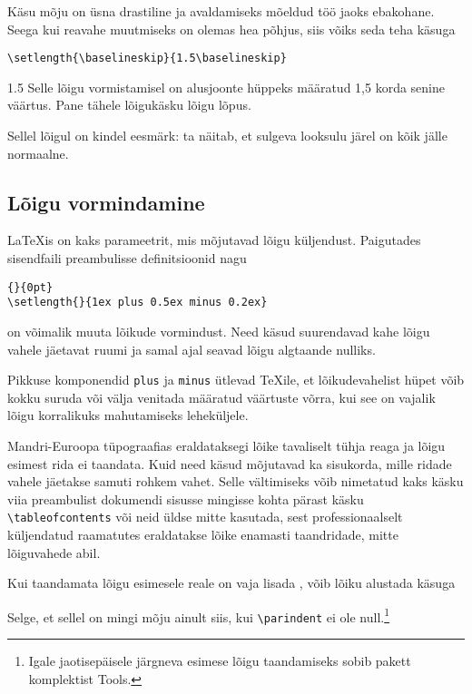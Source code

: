 Käsu  mõju on üsna drastiline ja avaldamiseks mõeldud töö
jaoks ebakohane. Seega kui reavahe muutmiseks on olemas hea põhjus, siis
võiks seda teha käsuga
\begin{lscommand}
\verb|\setlength{\baselineskip}{1.5\baselineskip}|
\end{lscommand}

\begin{example}
{\setlength{\baselineskip}%
           {1.5\baselineskip}
Selle lõigu vormistamisel on
alusjoonte hüppeks määratud 1{,}5
korda senine väärtus. Pane tähele
lõigukäsku lõigu lõpus.\par}

Sellel lõigul on kindel eesmärk:
ta näitab, et sulgeva looksulu
järel on kõik jälle normaalne.
\end{example}

\subsection{Lõigu vormindamine}\label{parsp}

\LaTeX is on kaks parameetrit, mis mõjutavad lõigu küljendust.
Paigutades sisendfaili preambulisse definitsioonid nagu
\begin{code}
\verb|{|\verb|}{0pt}| \\
\verb|\setlength{|\verb|}{1ex plus 0.5ex minus 0.2ex}|
\end{code}
on võimalik muuta lõikude vormindust. Need käsud suurendavad kahe lõigu
vahele jäetavat ruumi ja samal ajal seavad lõigu algtaande
nulliks.

Pikkuse komponendid \texttt{plus} ja \texttt{minus} ütlevad \TeX ile, et
lõikudevahelist hüpet võib kokku suruda või välja venitada määratud
väärtuste võrra, kui see on vajalik lõigu korralikuks mahutamiseks
leheküljele.

Mandri-Euroopa tüpograafias eraldataksegi lõike tavaliselt tühja reaga
ja lõigu esimest rida ei taandata. Kuid need käsud mõjutavad ka
sisukorda, mille ridade vahele jäetakse samuti rohkem vahet. Selle
vältimiseks võib nimetatud kaks käsku viia preambulist dokumendi sisusse
mingisse kohta pärast käsku \verb|\tableofcontents| või neid üldse mitte
kasutada, sest professionaalselt küljendatud raamatutes eraldatakse
lõike enamasti taandridade, mitte lõiguvahede abil.

Kui taandamata lõigu esimesele reale on vaja lisada , võib
lõiku alustada käsuga
\begin{lscommand}
\end{lscommand}
\noindent Selge, et sellel on mingi mõju ainult siis, kui
\verb|\parindent| ei ole null.\footnote{Igale jaotisepäisele järgneva
esimese lõigu taandamiseks sobib pakett  komplektist
Tools.}

